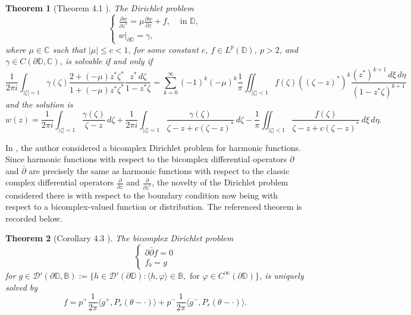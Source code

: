 \documentclass[12pt,reqno]{amsart}
\newtheorem{theorem}{Theorem}[section]
\theoremstyle{definition}
\theoremstyle{remark}
\newcommand{\p}{\partial}
\newcommand{\dbar}{\bar\partial}
\newcommand{\bc}{\mathbb{B}}
\newcommand{\disk}{\mathbb{D}}
\begin{document}
\begin{theorem}[Theorem 4.1 \cite{BeltramiSchwarz}]\label{thm: beltramidirichlet}
    The Dirichlet problem 
    \[
        \begin{cases}
            \frac{\p w}{\p z^*} = \mu \frac{\p w}{\p z} + f, & \text{ in } \disk,\\
            w|_{\p\disk} = \gamma,
        \end{cases}
    \]
    where $\mu \in \mathbb{C}$ such that $|\mu|\leq c < 1$, for some constant $c$, $f \in L^p(\disk)$, $p>2$, and $\gamma \in C(\p\disk,\mathbb{C})$, is solvable if and only if 
    \[
        \frac{1}{2\pi i} \int_{|\zeta| = 1} \gamma(\zeta) \frac{2 + (-\mu)z^* \zeta^*}{1 + (-\mu)z^*\zeta^*} \frac{z^* \,d\zeta}{1-z^*\zeta} = \sum_{k=0}^{\infty} (-1)^k (-\mu)^k \frac{1}{\pi} \iint_{|\zeta|<1} f(\zeta) ((\zeta - z)^*)^k \frac{(z^*)^{k+1} \,d\xi\,d\eta}{(1-z^*\zeta)^{k+1}}
    \]
    and the solution is 
    \[
        w(z) = \frac{1}{2\pi i} \int_{|\zeta| =1} \frac{\gamma(\zeta)}{\zeta - z} \,d\zeta + \frac{1}{2\pi i} \int_{|\zeta| =1} \frac{\gamma(\zeta)}{\zeta - z + c(\zeta - z)^*} \,d\zeta - \frac{1}{\pi} \iint_{|\zeta|<1} \frac{f(\zeta)}{\zeta - z + c(\zeta - z)^*}\,d\xi\,d\eta.
    \]
\end{theorem}

In \cite{BCSchwarz}, the author considered a bicomplex Dirichlet problem for harmonic functions. Since harmonic functions with respect to the bicomplex differential operators $\p$ and $\dbar$ are precisely the same as harmonic functions with respect to the classic complex differential operators $\frac{\p}{\p z}$ and $\frac{\p }{\p z^*}$, the novelty of the Dirichlet problem considered there is with respect to the boundary condition now being with respect to a bicomplex-valued function or distribution. The referenced theorem is recorded below. 

\begin{theorem}[Corollary 4.3 \cite{BCSchwarz}]
    The bicomplex Dirichlet problem
    \[
        \begin{cases}
            \p \dbar f = 0\\
            f_b = g
        \end{cases}
    \]
for $g \in \mathcal{D'}(\p \disk, \bc) := \{ h \in \mathcal{D}'(\p \disk): \langle h, \varphi \rangle \in \bc, \text{ for }\varphi \in C^\infty(\p \disk)\}$, is uniquely solved by 
\[
    f = p^+ \frac{1}{2\pi} \langle g^+, P_r(\theta - \cdot) \rangle + p^- \frac{1}{2\pi} \langle g^-, P_r(\theta - \cdot)  \rangle.
\]
\end{theorem}
\end{document}
